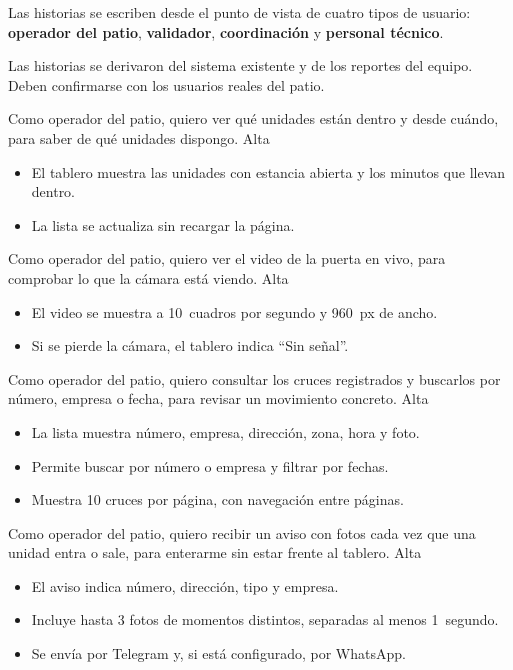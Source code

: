 Las historias se escriben desde el punto de vista de cuatro tipos de
usuario: \textbf{operador del patio}, \textbf{validador},
\textbf{coordinación} y \textbf{personal técnico}.

\begin{aviso}[title={Por validar}]
Las historias se derivaron del sistema existente y de los reportes del
equipo. Deben confirmarse con los usuarios reales del patio.
\end{aviso}

  {Como operador del patio, quiero ver qué unidades están dentro y desde
   cuándo, para saber de qué unidades dispongo.}
  {Alta}
  {\begin{itemize}[nosep,leftmargin=*]
     \item El tablero muestra las unidades con estancia abierta y los
           minutos que llevan dentro.
     \item La lista se actualiza sin recargar la página.
   \end{itemize}}

  {Como operador del patio, quiero ver el video de la puerta en vivo, para
   comprobar lo que la cámara está viendo.}
  {Alta}
  {\begin{itemize}[nosep,leftmargin=*]
     \item El video se muestra a 10~cuadros por segundo y 960~px de ancho.
     \item Si se pierde la cámara, el tablero indica ``Sin señal''.
   \end{itemize}}

  {Como operador del patio, quiero consultar los cruces registrados y
   buscarlos por número, empresa o fecha, para revisar un movimiento
   concreto.}
  {Alta}
  {\begin{itemize}[nosep,leftmargin=*]
     \item La lista muestra número, empresa, dirección, zona, hora y foto.
     \item Permite buscar por número o empresa y filtrar por fechas.
     \item Muestra 10 cruces por página, con navegación entre páginas.
   \end{itemize}}

  {Como operador del patio, quiero recibir un aviso con fotos cada vez que
   una unidad entra o sale, para enterarme sin estar frente al tablero.}
  {Alta}
  {\begin{itemize}[nosep,leftmargin=*]
     \item El aviso indica número, dirección, tipo y empresa.
     \item Incluye hasta 3 fotos de momentos distintos, separadas al menos
           1~segundo.
     \item Se envía por Telegram y, si está configurado, por WhatsApp.
   \end{itemize}}

